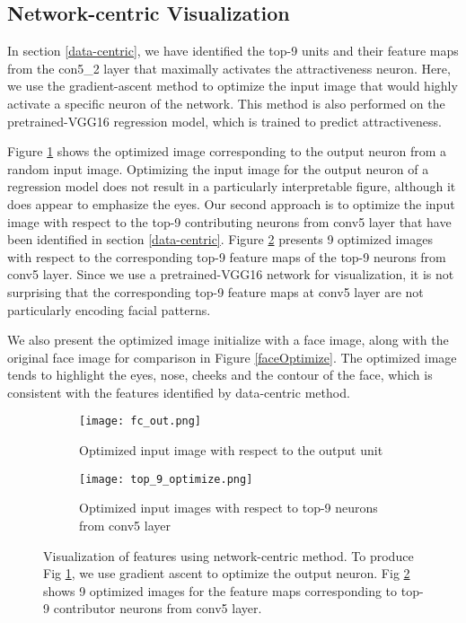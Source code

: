 \documentclass[10pt,twocolumn,letterpaper]{article}
\begin{document}
\subsection{Network-centric Visualization}
In section \ref{data-centric}, we have identified the top-9 units and their feature maps from the con5\_2 layer that maximally activates the attractiveness neuron. Here, we use the gradient-ascent method to optimize the input image that would highly activate a specific neuron of the network. This method is also performed on the pretrained-VGG16 regression model, which is trained to predict attractiveness.

Figure \ref{fc_out_optimize} shows the optimized image corresponding to the output neuron from a random input image. Optimizing the input image for the output neuron of a regression model does not result in a particularly interpretable figure, although it does appear to emphasize the eyes. Our second approach is to optimize the input image with respect to the top-9 contributing neurons from conv5 layer that have been identified in section \ref{data-centric}. Figure \ref{conv5_2_optimize} presents 9 optimized images with respect to the corresponding top-9 feature maps of the top-9 neurons from conv5 layer. Since we use a pretrained-VGG16 network for visualization, it is not surprising that the corresponding top-9 feature maps at conv5 layer are not particularly encoding facial patterns. 

We also present the optimized image initialize with a face image, along with the original face image for comparison in Figure \ref{faceOptimize}. The optimized image tends to highlight the eyes, nose, cheeks and the contour of the face, which is consistent with the features identified by data-centric method.  

\begin{figure}[!htbp]
\centering
\begin{subfigure}{.3\textwidth}
  \centering
  \texttt{[image: fc\_out.png]}
  \caption{Optimized input image with respect to the output unit}
  \label{fc_out_optimize}
\end{subfigure}
\begin{subfigure}{.5\textwidth}
  \centering
  \texttt{[image: top\_9\_optimize.png]}
  \caption{Optimized input images with respect to top-9 neurons from conv5 layer}
   \label{conv5_2_optimize}
\end{subfigure}
\caption{Visualization of features using network-centric method. To produce Fig \ref{fc_out_optimize}, we use gradient ascent to optimize the output neuron. Fig \ref{conv5_2_optimize} shows 9 optimized images for the feature maps corresponding to top-9 contributor neurons from conv5 layer.}
\label{network_optimize}
\end{figure}
\end{document}
